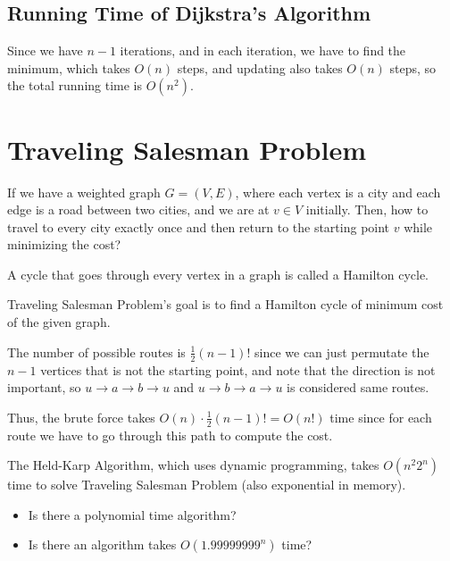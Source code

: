 \subsection{Running Time of Dijkstra's Algorithm}
Since we have \(n - 1\) iterations, and in each iteration, we have to find the minimum, which takes \(O(n)\) steps, and updating also takes \(O(n)\) steps, so the total running time is \(O\left( n^2 \right) \).

\section{Traveling Salesman Problem}
\begin{problem}
    If we have a weighted graph \(G=(V,E)\), where each vertex is a city and each edge is a road between two cities, and we are at \(v \in V\) initially. Then, how to travel to every city exactly once and then return to the starting point \(v\) while minimizing the cost?   
\end{problem}

\begin{definition}
    A cycle that goes through every vertex in a graph is called a Hamilton cycle.
\end{definition}

\begin{remark}
    Traveling Salesman Problem's goal is to find a Hamilton cycle of minimum cost of the given graph.
\end{remark}

\begin{observation}
    The number of possible routes is \(\frac{1}{2} (n - 1)!\) since we can just permutate the \(n - 1\) vertices that is not the starting point, and note that the direction is not important, so \(u \to a \to b \to u\) and \(u \to b \to a \to u\) is considered same routes.     
\end{observation}

Thus, the brute force takes \(O(n) \cdot \frac{1}{2} (n - 1)! = O(n!)\) time since for each route we have to go through this path to compute the cost.

\begin{remark}
    The Held-Karp Algorithm, which uses dynamic programming, takes \(O\left( n^2 2^n \right) \) time to solve Traveling Salesman Problem (also exponential in memory). 
\end{remark}

\begin{question}
    \hfil
    \begin{itemize}
        \item Is there a polynomial time algorithm?
        \item Is there an algorithm takes \(O(1.99999999^n)\) time?
    \end{itemize}
\end{question}
